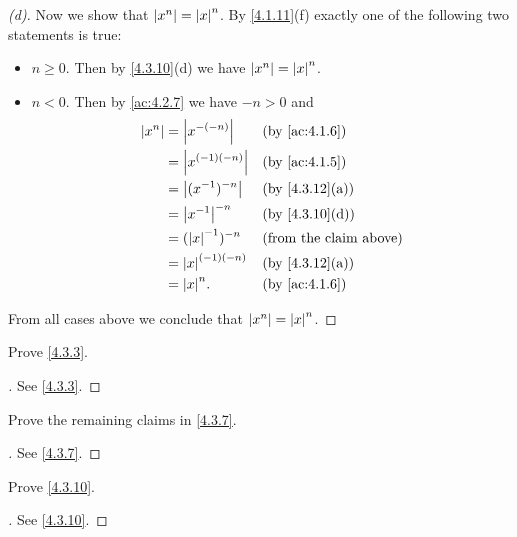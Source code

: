 \begin{proof}[(d)]
  Now we show that \(\left\lvert x^n\right\rvert = \left\lvert x\right\rvert^n\).
  By \cref{4.1.11}(f) exactly one of the following two statements is true:
  \begin{itemize}
    \item \(n \geq 0\).
          Then by \cref{4.3.10}(d) we have \(\left\lvert x^n\right\rvert = \left\lvert x\right\rvert^n\).
    \item \(n < 0\).
          Then by \cref{ac:4.2.7} we have \(-n > 0\) and
          \begin{align*}
            \abs{x^n} & = \abs{x^{-(-n)}}     &  & \by{ac:4.1.6}                 \\
                      & = \abs{x^{(-1) (-n)}} &  & \by{ac:4.1.5}                 \\
                      & = \abs{(x^{-1})^{-n}} &  & \by{4.3.12}[a]                \\
                      & = \abs{x^{-1}}^{-n}   &  & \by{4.3.10}[d]                \\
                      & = (\abs{x}^{-1})^{-n} &  & \text{(from the claim above)} \\
                      & = \abs{x}^{(-1) (-n)} &  & \by{4.3.12}[a]                \\
                      & = \abs{x}^n.          &  & \by{ac:4.1.6}
          \end{align*}
  \end{itemize}
  From all cases above we conclude that \(\left\lvert x^n\right\rvert = \left\lvert x\right\rvert^n\).
\end{proof}

\exercisesection

\begin{ex}\label{ex:4.3.1}
  Prove \cref{4.3.3}.
\end{ex}

\begin{proof}[]
  See \cref{4.3.3}.
\end{proof}

\begin{ex}\label{ex:4.3.2}
  Prove the remaining claims in \cref{4.3.7}.
\end{ex}

\begin{proof}[]
  See \cref{4.3.7}.
\end{proof}

\begin{ex}\label{ex:4.3.3}
  Prove \cref{4.3.10}.
\end{ex}

\begin{proof}[]
  See \cref{4.3.10}.
\end{proof}

